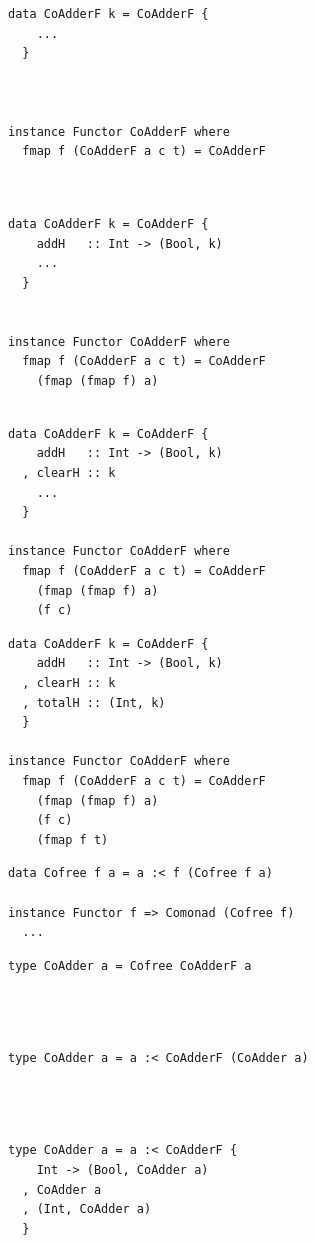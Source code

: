 \documentclass{beamer}
\begin{document}
\begin{frame}[fragile]
  \begin{overprint}
  \begin{verbatim}
data CoAdderF k = CoAdderF {
    ...
  }



instance Functor CoAdderF where
  fmap f (CoAdderF a c t) = CoAdderF



  \end{verbatim}
  \begin{verbatim}
data CoAdderF k = CoAdderF {
    addH   :: Int -> (Bool, k)
    ...
  }


instance Functor CoAdderF where
  fmap f (CoAdderF a c t) = CoAdderF
    (fmap (fmap f) a)


  \end{verbatim}
  \begin{verbatim}
data CoAdderF k = CoAdderF {
    addH   :: Int -> (Bool, k)
  , clearH :: k
    ...
  }

instance Functor CoAdderF where
  fmap f (CoAdderF a c t) = CoAdderF
    (fmap (fmap f) a)
    (f c)

  \end{verbatim}
  \begin{verbatim}
data CoAdderF k = CoAdderF {
    addH   :: Int -> (Bool, k)
  , clearH :: k
  , totalH :: (Int, k)
  }

instance Functor CoAdderF where
  fmap f (CoAdderF a c t) = CoAdderF
    (fmap (fmap f) a)
    (f c)
    (fmap f t)
  \end{verbatim}
  \end{overprint}
\end{frame}

\begin{frame}[fragile]
  \begin{verbatim}
data Cofree f a = a :< f (Cofree f a)

instance Functor f => Comonad (Cofree f)
  ...
  \end{verbatim}
\end{frame}

\begin{frame}[fragile]
  \begin{overprint}
  \begin{verbatim}
type CoAdder a = Cofree CoAdderF a




  \end{verbatim}
  \begin{verbatim}
type CoAdder a = a :< CoAdderF (CoAdder a)




  \end{verbatim}
  \begin{verbatim}
type CoAdder a = a :< CoAdderF {
    Int -> (Bool, CoAdder a)
  , CoAdder a
  , (Int, CoAdder a)
  }
  \end{verbatim}
  \end{overprint}
\end{frame}
\end{document}
